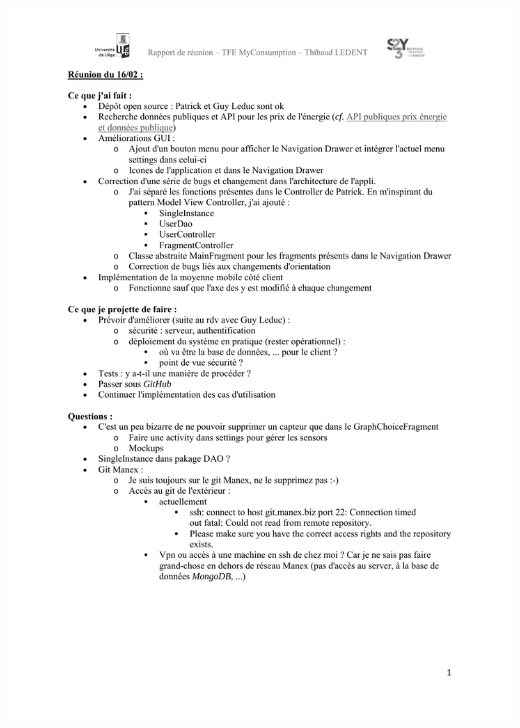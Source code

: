 \documentclass[a4paper, oneside, 11pt]{book}
\begin{document}
\includegraphics[width=1\textwidth]{reports_NB_Part10.pdf}
\newpage
\end{document}

